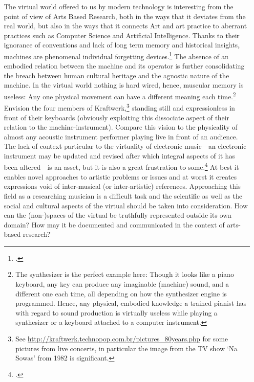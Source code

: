 The virtual world offered to us by modern technology is interesting from the point of view of Arts Based Research, both in the ways that it deviates from the real world, but also in the ways that it connects Art and art practice to aberrant practices such as Computer Science and Artificial Intelligence. Thanks to their ignorance of conventions and lack of long term memory and historical insights, machines are phenomenal individual forgetting devices.\footcite[See][]{miller04} The absence of an embodied relation between the machine and its operator is further consolidating the breach between human cultural heritage and the agnostic nature of the machine. In the virtual world nothing is hard wired, hence, muscular memory is useless: Any one physical movement can have a different meaning each time.\footnote{The synthesizer is the perfect example here: Though it looks like a piano keyboard, any key can produce any imaginable (machine) sound, and a different one each time, all depending on how the synthesizer engine is programmed. Hence, any physical, embodied knowledge a trained pianist has with regard to sound production is virtually useless while playing a synthesizer or a keyboard attached to a computer instrument.} Envision the four members of Kraftwerk,\footnote{See \url{http://kraftwerk.technopop.com.br/pictures\_80years.php} for some pictures from live concerts, in particular the image from the TV show `Na Sowas' from 1982 is significant.} standing still and expressionless in front of their keyboards (obviously exploiting this dissociate aspect of their relation to the machine-instrument). Compare this vision to the physicality of almost any acoustic instrument performer playing live in front of an audience. The lack of context particular to the virtuality of electronic music---an electronic instrument may be updated and revised after which integral aspects of it has been altered---is an asset, but it is also a great frustration to some.\footcite[E.g.][]{ostertag02} At best it enables novel approaches to artistic problems or issues and at worst it creates expressions void of inter-musical (or inter-artistic) references. Approaching this field as a researching musician is a difficult task and the scientific as well as the social and cultural aspects of the virtual should be taken into consideration. How can the (non-)spaces of the virtual be truthfully represented outside its own domain? How may it be documented and communicated in the context of arts-based research?

